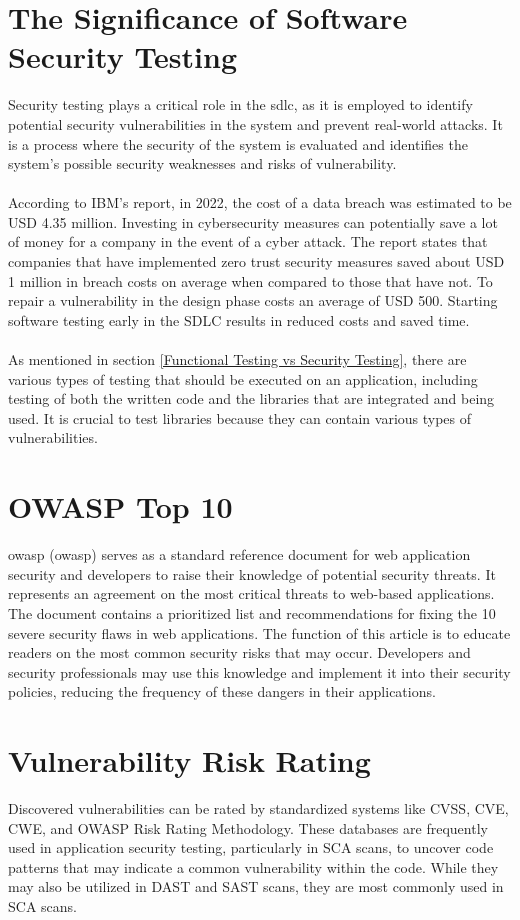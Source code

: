 \section{The Significance of Software Security Testing}
Security testing plays a critical role in the \acrlong{sdlc}, as it is employed to identify potential security vulnerabilities in the system and prevent real-world attacks. It is a process where the security of the system is evaluated and identifies the system's possible security weaknesses and risks of vulnerability.\cite{whysectest}
\\~\\
According to IBM's report, in 2022, the cost of a data breach was estimated to be USD 4.35 million\cite{databreach}. Investing in cybersecurity measures can potentially save a lot of money for a company in the event of a cyber attack. The report states that companies that have implemented zero trust security measures saved about USD 1 million in breach costs on average when compared to those that have not. To repair a vulnerability in the design phase costs an average of USD 500\cite{fixvulnerability}. Starting software testing early in the SDLC results in reduced costs and saved time. 
\\~\\
As mentioned in section \ref{Functional Testing vs Security Testing}, there are various types of testing that should be executed on an application, including testing of both the written code and the libraries that are integrated and being used. It is crucial to test libraries because they can contain various types of vulnerabilities. \cite{testlibaries}

\section{OWASP Top 10}
\acrlong{owasp} (\acrshort{owasp}) serves as a standard reference document for web application security and developers to raise their knowledge of potential security threats. It represents an agreement on the most critical threats to web-based applications. The document contains a prioritized list and recommendations for fixing the 10 severe security flaws in web applications. The function of this article is to educate readers on the most common security risks that may occur. Developers and security professionals may use this knowledge and implement it into their security policies, reducing the frequency of these dangers in their applications. 


\section{Vulnerability Risk Rating}
Discovered vulnerabilities can be rated by standardized systems like CVSS, CVE, CWE, and OWASP Risk Rating Methodology. These databases are frequently used in application security testing, particularly in SCA scans, to uncover code patterns that may indicate a common vulnerability within the code. While they may also be utilized in DAST and SAST scans, they are most commonly used in SCA scans. 

